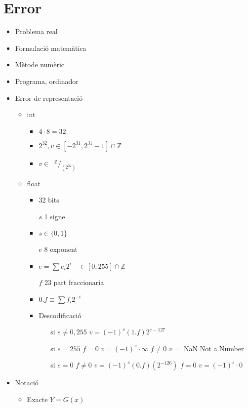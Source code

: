 \documentclass[a4paper,10pt]{article}
\newcommand{\blue}[1]{{\color{blue}#1}}
\newcommand{\Z}{\mathbb{Z}}
\begin{document}
\section{Error}
\begin{itemize}
\item Problema real
\item Formulació matemàtica
\item Mètode numèric
\item Programa, ordinador
\item Error de representació
	\begin{itemize}
	\item int
		\begin{itemize}
		\item $4\cdot 8 = 32$
		\item $2^{32}, v \in [-2^{31}, 2^{31}-1] \cap \Z$
		\item $v \in \phantom{a}^\Z\! / _{(2^{32})}$
		\end{itemize}
	\item float
		\begin{itemize}
		\item 32 bits
		\item[$s$] 1 signe
		\item $s \in \{0, 1\}$
		\item[$e$] 8 exponent
		\item $e = \sum e_i 2^i \quad \in [0, 255] \cap \Z$
		\item[$f$] 23 part fraccionaria
		\item $0.f \equiv \sum f_i2^{-i}$
		\item Descodificació
			\begin{itemize}
			\item[si] $e \neq 0, 255$
				\subitem $v = (-1)^s (1.f)2^{e-127}$
			\item[si] $e = 255$
				\subitem[si] $f = 0$
					\subsubitem $v = (-1)^s \cdot \infty$
				\subitem[si] $f \neq 0$
					\subsubitem $v =$ NaN \blue{Not a Number}
			\item[si] $e = 0$
				\subitem[si] $f \neq 0$
					\subsubitem $v = (-1)^s(0.f)(2^{-126})$
				\subitem[si] $f = 0$
					\subsubitem $v = (-1)^s \cdot 0$
			\end{itemize}
		\end{itemize}
	\end{itemize}
\item Notació
	\begin{itemize}
	\item Exacte
		\subitem $Y = G(x)$

\end{itemize}
\end{itemize}
\end{document}
